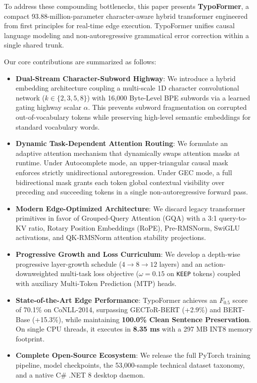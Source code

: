 \documentclass[10pt,journal,compsoc]{IEEEtran}
\begin{document}
To address these compounding bottlenecks, this paper presents \textbf{TypoFormer}, a compact 93.88-million-parameter character-aware hybrid transformer engineered from first principles for real-time edge execution. TypoFormer unifies causal language modeling and non-autoregressive grammatical error correction within a single shared trunk.

Our core contributions are summarized as follows:
\begin{itemize}
    \item \textbf{Dual-Stream Character-Subword Highway}: We introduce a hybrid embedding architecture coupling a multi-scale 1D character convolutional network ($k \in \{2, 3, 5, 8\}$) with 16,000 Byte-Level BPE subwords via a learned gating highway scalar $\alpha$. This prevents subword fragmentation on corrupted out-of-vocabulary tokens while preserving high-level semantic embeddings for standard vocabulary words.
    \item \textbf{Dynamic Task-Dependent Attention Routing}: We formulate an adaptive attention mechanism that dynamically swaps attention masks at runtime. Under Autocomplete mode, an upper-triangular causal mask enforces strictly unidirectional autoregression. Under GEC mode, a full bidirectional mask grants each token global contextual visibility over preceding and succeeding tokens in a single non-autoregressive forward pass.
    \item \textbf{Modern Edge-Optimized Architecture}: We discard legacy transformer primitives in favor of Grouped-Query Attention (GQA) with a 3:1 query-to-KV ratio, Rotary Position Embeddings (RoPE), Pre-RMSNorm, SwiGLU activations, and QK-RMSNorm attention stability projections.
    \item \textbf{Progressive Growth and Loss Curriculum}: We develop a depth-wise progressive layer-growth schedule ($4 \to 8 \to 12$ layers) and an action-downweighted multi-task loss objective ($\omega = 0.15$ on \texttt{KEEP} tokens) coupled with auxiliary Multi-Token Prediction (MTP) heads.
    \item \textbf{State-of-the-Art Edge Performance}: TypoFormer achieves an $F_{0.5}$ score of 70.1\% on CoNLL-2014, surpassing GECToR-BERT (+2.9\%) and BERT-Base (+15.3\%), while maintaining \textbf{100.0\% Clean Sentence Preservation}. On single CPU threads, it executes in \textbf{8.35 ms} with a 297 MB INT8 memory footprint.
    \item \textbf{Complete Open-Source Ecosystem}: We release the full PyTorch training pipeline, model checkpoints, the 53,000-sample technical dataset taxonomy, and a native C\# .NET 8 desktop daemon.
\end{itemize}
\end{document}

